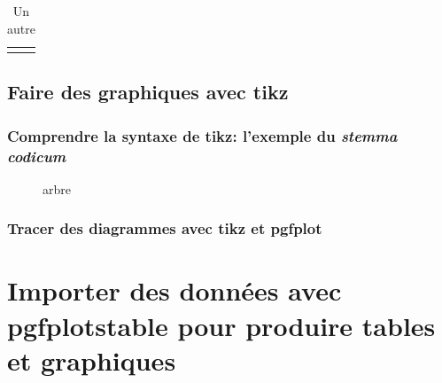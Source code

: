 \documentclass[12pt,a4paper]{article}
\begin{document}
\begin{table}
\begin{tabular}{|p{9cm}|m{9cm}|}
	\hline
	&  \\
	\hline
	&  \\
	\hline
\end{tabular}
	\caption{Un autre}
\end{table}

\subsection{Faire des graphiques avec tikz}

\subsubsection{Comprendre la syntaxe de tikz: l'exemple du \emph{stemma codicum}}

\begin{figure}[h]
\caption{arbre}
\end{figure}

\subsubsection{Tracer des diagrammes avec tikz  et pgfplot}


\section{Importer des données avec pgfplotstable pour produire tables et graphiques}
\end{document}
